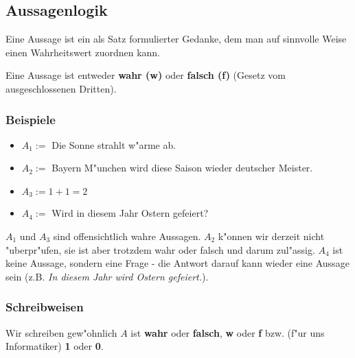 \subsection{Aussagenlogik}
\begin{definition}[Aussage]
Eine Aussage ist ein als Satz formulierter Gedanke, dem man auf sinnvolle Weise einen Wahrheitswert zuordnen kann.
\end{definition}
Eine Aussage ist entweder \textbf{wahr (w)} oder \textbf{falsch (f)} (Gesetz vom ausgeschlossenen Dritten).

\subsubsection*{Beispiele}
\begin{itemize}
\item $A_1 := $ Die Sonne strahlt w"arme ab.
\item $A_2 := $ Bayern M"unchen wird diese Saison wieder deutscher Meister.
\item $A_3 := 1+1 = 2$
\item $A_4 := $ Wird in diesem Jahr Ostern gefeiert?
\end{itemize}
$A_1$ und $A_3$ sind offensichtlich wahre Aussagen. $A_2$ k"onnen wir derzeit nicht "uberpr"ufen, sie ist aber trotzdem wahr oder falsch und darum zul"assig. $A_4$ ist keine Aussage, sondern eine Frage - die Antwort darauf kann wieder eine Aussage sein (z.B. \textit{In diesem Jahr wird Ostern gefeiert.}).

\subsubsection*{Schreibweisen}
Wir schreiben gew"ohnlich $A$ ist \textbf{wahr} oder \textbf{falsch}, \textbf{w} oder \textbf{f} bzw. (f"ur uns Informatiker) \textbf{1} oder \textbf{0}.

